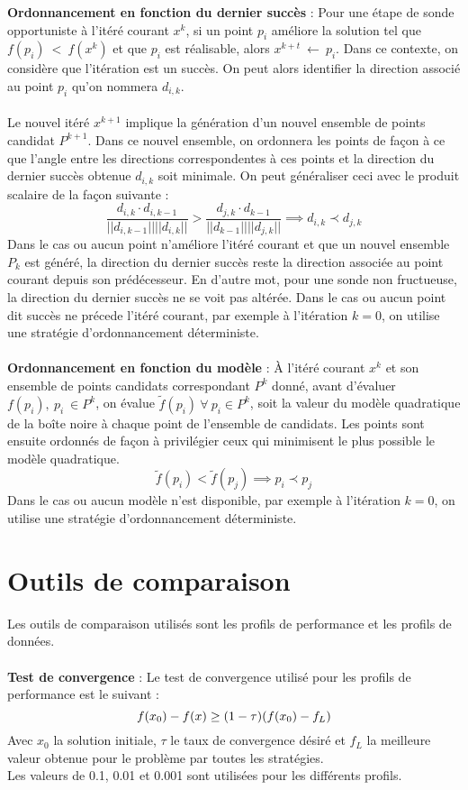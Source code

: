 \documentclass[letterpaper]{scrartcl}
\begin{document}
\indent \textbf{Ordonnancement en fonction du dernier succès} : Pour une étape de sonde opportuniste à l'itéré courant $x^k$, si un point $p_i$ améliore la solution tel que $f(p_i)\ <\ f(x^k)$ et que $p_i$ est réalisable, alors $x^{k+t}\ \leftarrow \ p_i$. Dans ce contexte, on considère que l'itération est un succès. On peut alors identifier la direction associé au point $p_i$ qu'on nommera $d_{i,k}$. \\\\
\indent Le nouvel itéré $x^{k+1}$ implique la génération d'un nouvel ensemble de points candidat $P^{k+1}$. Dans ce nouvel ensemble, on ordonnera les points de façon à ce que l'angle entre les directions correspondentes à ces points et la direction du dernier succès obtenue $d_{i,k}$ soit minimale. On peut généraliser ceci avec le produit scalaire de la façon suivante : 
\begin{equation}
\frac{d_{i,k}\cdot d_{i,k-1}}{||d_{i,k-1}||||{d_{i,k}||}} > \frac{d_{j,k}\cdot d_{k-1}}{||d_{k-1}||||{d_{j,k}||}}  \implies d_{i,k} \prec d_{j,k}  
\end{equation}
Dans le cas ou aucun point n'améliore l'itéré courant et que un nouvel ensemble $P_k$ est généré, la direction du dernier succès reste la direction associée au point courant depuis son prédécesseur. En d'autre mot, pour une sonde non fructueuse, la direction du dernier succès ne se voit pas altérée. Dans le cas ou aucun point dit succès ne précede l'itéré courant, par exemple à l'itération $k=0$, on utilise une stratégie d'ordonnancement déterministe.
\\\\
\textbf{Ordonnancement en fonction du modèle} : À l'itéré courant $x^k$ et son ensemble de points candidats correspondant $P^k$ donné, avant d'évaluer $f(p_i), \ p_i \ \in P^k$, on évalue $\tilde{f}(p_i) \ \forall \ p_i \in P^k$, soit la valeur du modèle quadratique de la boîte noire à chaque point de l'ensemble de candidats. Les points sont ensuite ordonnés de façon à privilégier ceux qui minimisent le plus possible le modèle quadratique. 
\begin{equation}
\tilde{f}(p_i) < \tilde{f}(p_j) \implies p_i \prec p_j
\end{equation}
Dans le cas ou aucun modèle n'est disponible, par exemple à l'itération $k=0$, on utilise une stratégie d'ordonnancement déterministe.
\section{Outils de comparaison}
Les outils de comparaison utilisés sont les profils de performance et les profils de données.
\\\\
\textbf{Test de convergence} : Le test de convergence utilisé pour les profils de performance est le suivant : 
\begin{equation}
f(x_0) - f(x) \geq (1-\tau)(f(x_0)-f_L)\\
\end{equation} 
Avec $x_0$ la solution initiale, $\tau$ le taux de convergence désiré et $f_L$ la meilleure valeur obtenue pour le problème par toutes les stratégies.\\
Les valeurs de 0.1, 0.01 et 0.001 sont utilisées pour les différents profils.\clearpage
\end{document}
